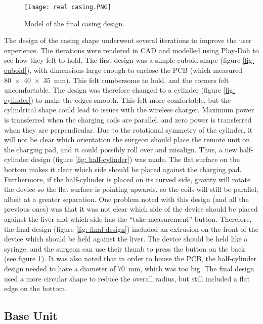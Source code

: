 \begin{figure}[h!]
	\centering
	\texttt{[image: real casing.PNG]}
	\caption{Model of the final casing design.}
	\label{fig: real casing}
\end{figure}

The design of the casing shape underwent several iterations to improve the user experience. The iterations were rendered in CAD and modelled using Play-Doh to see how they felt to hold. The first design was a simple cuboid shape (figure \ref{fig: cuboid}), with dimensions large enough to enclose the PCB (which measured \SI{80x40x35}{\milli\metre}). This felt cumbersome to hold, and the corners felt uncomfortable. The design was therefore changed to a cylinder (figure \ref{fig: cylinder}) to make the edges smooth. This felt more comfortable, but the cylindrical shape could lead to issues with the wireless charger. Maximum power is transferred when the charging coils are parallel, and zero power is transferred when they are perpendicular. Due to the rotational symmetry of the cylinder, it will not be clear which orientation the surgeon should place the remote unit on the charging pad, and it could possibly roll over and misalign. Thus, a new half-cylinder design (figure \ref{fig: half-cylinder}) was made. The flat surface on the bottom makes it clear which side should be placed against the charging pad. Furthermore, if the half-cylinder is placed on its curved side, gravity will rotate the device so the flat surface is pointing upwards, so the coils will still be parallel, albeit at a greater separation. One problem noted with this design (and all the previous ones) was that it was not clear which side of the device should be placed against the liver and which side has the ``take-measurement'' button. Therefore, the final design (figure \ref{fig: final design}) included an extrusion on the front of the device which should be held against the liver. The device should be held like a syringe, and the surgeon can use their thumb to press the button on the back (see figure \ref{fig: real casing}). It was also noted that in order to house the PCB, the half-cylinder design needed to have a diameter of \SI{70}{\milli\metre}, which was too big. The final design used a more circular shape to reduce the overall radius, but still included a flat edge on the bottom.





\FloatBarrier
\subsection{Base Unit}\label{base casing}

